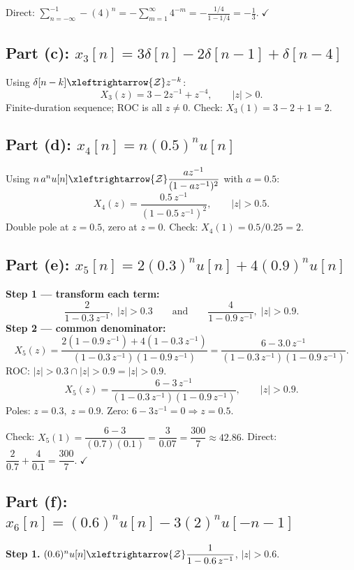 \documentclass[11pt]{article}
\newcommand{\zt}{\xleftrightarrow{\mathcal{Z}}}
\begin{document}
Direct: $\displaystyle\sum_{n=-\infty}^{-1}-(4)^{n}=-\sum_{m=1}^{\infty}4^{-m}=-\frac{1/4}{1-1/4}=-\frac{1}{3}.\;\checkmark$

\subsection*{Part (c): $x_3[n] = 3\delta[n]-2\delta[n-1]+\delta[n-4]$}
Using $\delta[n-k]\zt z^{-k}$:
\begin{equation*}
\boxed{X_3(z)=3-2z^{-1}+z^{-4}, \qquad |z|>0.}
\end{equation*}
Finite-duration sequence; ROC is all $z\neq 0$. Check: $X_3(1)=3-2+1=2$.

\subsection*{Part (d): $x_4[n] = n(0.5)^{n}u[n]$}
Using $n\,a^{n}u[n]\zt \dfrac{az^{-1}}{(1-az^{-1})^{2}}$ with $a=0.5$:
\begin{equation*}
\boxed{X_4(z)=\dfrac{0.5\,z^{-1}}{(1-0.5\,z^{-1})^{2}}, \qquad |z|>0.5.}
\end{equation*}
Double pole at $z=0.5$, zero at $z=0$. Check: $X_4(1)=0.5/0.25=2$.

\subsection*{Part (e): $x_5[n] = 2(0.3)^{n}u[n]+4(0.9)^{n}u[n]$}
\textbf{Step 1 --- transform each term:}
\[
\frac{2}{1-0.3\,z^{-1}},\;|z|>0.3 \qquad\text{and}\qquad \frac{4}{1-0.9\,z^{-1}},\;|z|>0.9.
\]
\textbf{Step 2 --- common denominator:}
\[
X_5(z)=\frac{2(1-0.9\,z^{-1})+4(1-0.3\,z^{-1})}{(1-0.3\,z^{-1})(1-0.9\,z^{-1})}=\frac{6-3.0\,z^{-1}}{(1-0.3\,z^{-1})(1-0.9\,z^{-1})}.
\]
ROC: $|z|>0.3 \cap |z|>0.9 = |z|>0.9$.
\begin{equation*}
\boxed{X_5(z)=\dfrac{6-3\,z^{-1}}{(1-0.3\,z^{-1})(1-0.9\,z^{-1})}, \qquad |z|>0.9.}
\end{equation*}
Poles: $z=0.3,\;z=0.9$. Zero: $6-3z^{-1}=0\Rightarrow z=0.5$.

Check: $X_5(1)=\dfrac{6-3}{(0.7)(0.1)}=\dfrac{3}{0.07}=\dfrac{300}{7}\approx 42.86$. Direct: $\dfrac{2}{0.7}+\dfrac{4}{0.1}=\dfrac{300}{7}.\;\checkmark$

\subsection*{Part (f): $x_6[n] = (0.6)^{n}u[n]-3(2)^{n}u[-n-1]$}
\textbf{Step 1.} $(0.6)^{n}u[n]\zt\dfrac{1}{1-0.6\,z^{-1}}$, $|z|>0.6$.
\end{document}
